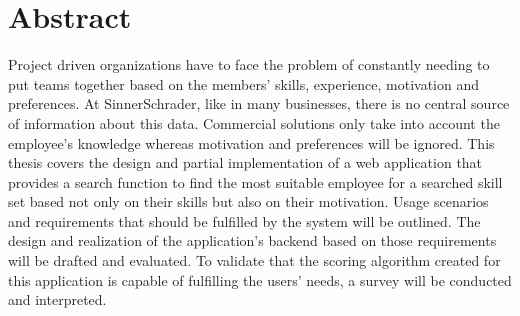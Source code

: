 \chapter{Abstract}
Project driven organizations have to face the problem of constantly needing to put teams together based on the members’ skills, experience, motivation and preferences. At SinnerSchrader, like in many businesses, there is no central source of information about this data. Commercial solutions only take into account the employee’s knowledge whereas motivation and preferences will be ignored.
This thesis covers the design and partial implementation of a web application that provides a search function to find the most suitable employee for a searched skill set based not only on their skills but also on their motivation.
Usage scenarios and requirements that should be fulfilled by the system will be outlined. The design and realization of the application’s backend based on those requirements will be drafted and evaluated. To validate that the scoring algorithm created for this application is capable of fulfilling the users’ needs, a survey will be conducted and interpreted.
